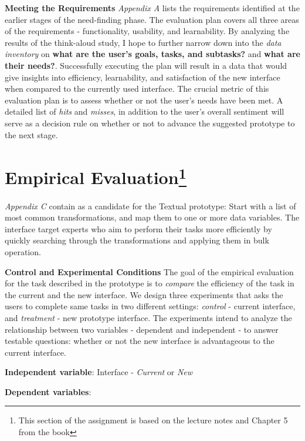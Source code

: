 \documentclass[12pt,letterpaper]{article}
\begin{document}
\textbf{Meeting the Requirements} \textit{Appendix A} lists the requirements identified at the earlier stages of the need-finding phase. The evaluation plan covers all three areas of the requirements - functionality, usability, and learnability. By analyzing the results of the think-aloud study, I hope to further narrow down into the \textit{data inventory} on \textbf{what are the user's goals, tasks, and subtasks?} and \textbf{what are their needs?}.  Successfully executing the plan will result in a data that would give insights into efficiency, learnability, and satisfaction of the new interface when compared to the currently used interface. The crucial metric of this evaluation plan is to assess whether or not the user's needs have been met. A detailed list of \textit{hits} and \textit{misses}, in addition to the user's overall sentiment will serve as a decision rule on whether or not to advance the suggested prototype to the next stage. 


\section*{Empirical Evaluation\footnote{This section of the assignment is based on the lecture notes and Chapter 5 from the \cite{mackenzie2012human} book}}
\textit{Appendix C}  contain as a candidate for the Textual prototype: Start with a list of most common transformations, and map them to one or more data variables. The interface target experts who aim to perform their tasks more efficiently by quickly searching through the transformations and applying them in bulk operation.

\textbf{Control and Experimental Conditions}
The goal of the empirical evaluation for the task described in the prototype is to \textit{compare} the efficiency of the task in the current and the new interface. We design three experiments that asks the users to complete same tasks in two different settings: \textit{control} - current interface, and \textit{treatment} - new prototype interface. The experiments intend to analyze the relationship between two variables - dependent and independent - to answer testable questions:  whether or not the new interface is advantageous to the current interface.

\hspace{10mm} \textbf{Independent variable}: Interface - \textit{Current} or \textit{New}  

\hspace{10mm} \textbf{Dependent variables}: 
\end{document}
